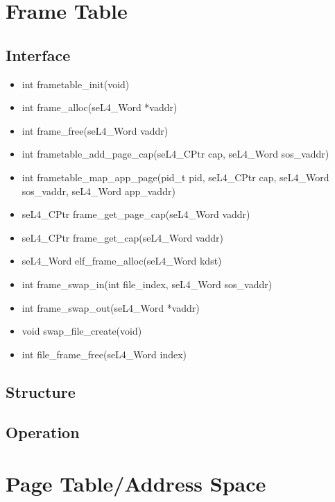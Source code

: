 \documentclass[12pt]{article}
\begin{document}
\clearpage
\section{Frame Table}
\subsection{Interface}
\begin{itemize}
\item int frametable\_init(void)
\item int frame\_alloc(seL4\_Word *vaddr)
\item int frame\_free(seL4\_Word vaddr)
\item int frametable\_add\_page\_cap(seL4\_CPtr cap, seL4\_Word sos\_vaddr)
\item int frametable\_map\_app\_page(pid\_t pid, seL4\_CPtr cap, seL4\_Word sos\_vaddr, seL4\_Word           app\_vaddr)
\item seL4\_CPtr frame\_get\_page\_cap(seL4\_Word vaddr)
\item seL4\_CPtr frame\_get\_cap(seL4\_Word vaddr)
\item seL4\_Word elf\_frame\_alloc(seL4\_Word kdst)
\item int frame\_swap\_in(int file\_index, seL4\_Word sos\_vaddr)
\item int frame\_swap\_out(seL4\_Word *vaddr)
\item void swap\_file\_create(void)
\item int file\_frame\_free(seL4\_Word index)
\end{itemize}
\subsection{Structure}
\subsection{Operation}

\clearpage
\section{Page Table/Address Space}
\end{document}
